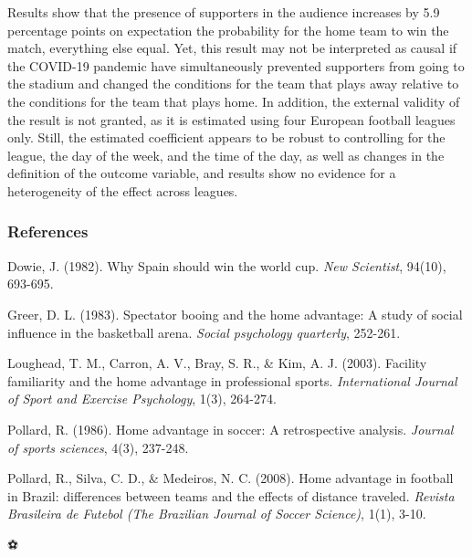 \documentclass[
]{article}
\begin{document}
Results show that the presence of supporters in the audience increases
by 5.9 percentage points on expectation the probability for the home
team to win the match, everything else equal. Yet, this result may not
be interpreted as causal if the COVID-19 pandemic have simultaneously
prevented supporters from going to the stadium and changed the
conditions for the team that plays away relative to the conditions for
the team that plays home. In addition, the external validity of the
result is not granted, as it is estimated using four European football
leagues only. Still, the estimated coefficient appears to be robust to
controlling for the league, the day of the week, and the time of the
day, as well as changes in the definition of the outcome variable, and
results show no evidence for a heterogeneity of the effect across
leagues.

\hypertarget{references}{%
\subsubsection{References}\label{references}}

Dowie, J. (1982). Why Spain should win the world cup. \emph{New
Scientist}, 94(10), 693-695.

Greer, D. L. (1983). Spectator booing and the home advantage: A study of
social influence in the basketball arena. \emph{Social psychology
quarterly}, 252-261.

Loughead, T. M., Carron, A. V., Bray, S. R., \& Kim, A. J. (2003).
Facility familiarity and the home advantage in professional sports.
\emph{International Journal of Sport and Exercise Psychology}, 1(3),
264-274.

Pollard, R. (1986). Home advantage in soccer: A retrospective analysis.
\emph{Journal of sports sciences}, 4(3), 237-248.

Pollard, R., Silva, C. D., \& Medeiros, N. C. (2008). Home advantage in
football in Brazil: differences between teams and the effects of
distance traveled. \emph{Revista Brasileira de Futebol (The Brazilian
Journal of Soccer Science)}, 1(1), 3-10.

⚽
\end{document}
